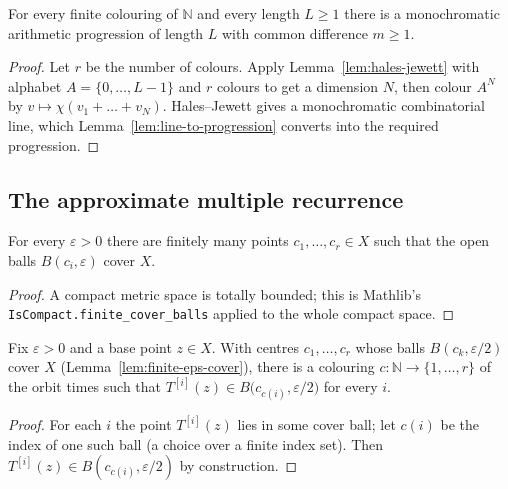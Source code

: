 \begin{theorem}
    \label{thm:van-der-waerden}
    \leanok
    For every finite colouring of $\mathbb{N}$ and every length $L \ge 1$ there
    is a monochromatic arithmetic progression of length $L$ with common
    difference $m \ge 1$.
\end{theorem}
\begin{proof}
    Let $r$ be the number of colours. Apply Lemma~\ref{lem:hales-jewett} with
    alphabet $A = \{0, \dots, L-1\}$ and $r$ colours to get a dimension $N$,
    then colour $A^N$ by $v \mapsto \chi(v_1 + \dots + v_N)$. Hales--Jewett gives
    a monochromatic combinatorial line, which
    Lemma~\ref{lem:line-to-progression} converts into the required progression.
\end{proof}

\subsection{The approximate multiple recurrence}

\begin{lemma}
    \label{lem:finite-eps-cover}
    \leanok
    For every $\varepsilon > 0$ there are finitely many points
    $c_1, \dots, c_r \in X$ such that the open balls $B(c_i, \varepsilon)$ cover
    $X$.
\end{lemma}
\begin{proof}
    A compact metric space is totally bounded; this is Mathlib's
    \texttt{IsCompact.finite\_cover\_balls} applied to the whole compact space.
\end{proof}

\begin{lemma}
    \label{lem:orbit-colouring}
    \leanok
    Fix $\varepsilon > 0$ and a base point $z \in X$. With centres
    $c_1, \dots, c_r$ whose balls $B(c_k, \varepsilon/2)$ cover $X$
    (Lemma~\ref{lem:finite-eps-cover}), there is a colouring
    $c : \mathbb{N} \to \{1, \dots, r\}$ of the orbit times such that
    $T^{[i]}(z) \in B\bigl(c_{c(i)}, \varepsilon/2\bigr)$ for every $i$.
\end{lemma}
\begin{proof}
    For each $i$ the point $T^{[i]}(z)$ lies in some cover ball; let $c(i)$ be
    the index of one such ball (a choice over a finite index set). Then
    $T^{[i]}(z) \in B(c_{c(i)}, \varepsilon/2)$ by construction.
\end{proof}

